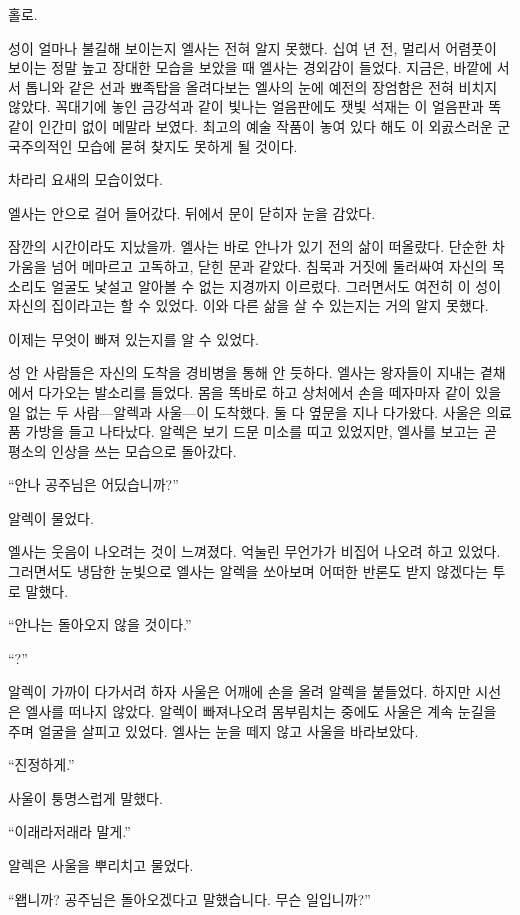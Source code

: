 홀로.

성이 얼마나 불길해 보이는지 엘사는 전혀 알지 못했다. 십여 년 전, 멀리서 어렴풋이 보이는 정말 높고 장대한 모습을 보았을 때 엘사는 경외감이 들었다. 지금은, 바깥에 서서 톱니와 같은 선과 뾰족탑을 올려다보는 엘사의 눈에 예전의 장엄함은 전혀 비치지 않았다. 꼭대기에 놓인 금강석과 같이 빛나는 얼음판에도 잿빛 석재는 이 얼음판과 똑같이 인간미 없이 메말라 보였다. 최고의 예술 작품이 놓여 있다 해도 이 외곬스러운 군국주의적인 모습에 묻혀 찾지도 못하게 될 것이다.

차라리 요새의 모습이었다.

엘사는 안으로 걸어 들어갔다. 뒤에서 문이 닫히자 눈을 감았다.

잠깐의 시간이라도 지났을까. 엘사는 바로 안나가 있기 전의 삶이 떠올랐다. 단순한 차가움을 넘어 메마르고 고독하고, 닫힌 문과 같았다. 침묵과 거짓에 둘러싸여 자신의 목소리도 얼굴도 낯설고 알아볼 수 없는 지경까지 이르렀다. 그러면서도 여전히 이 성이 자신의 집이라고는 할 수 있었다. 이와 다른 삶을 살 수 있는지는 거의 알지 못했다.

이제는 무엇이 빠져 있는지를 알 수 있었다.

성 안 사람들은 자신의 도착을 경비병을 통해 안 듯하다. 엘사는 왕자들이 지내는 곁채에서 다가오는 발소리를 들었다. 몸을 똑바로 하고 상처에서 손을 떼자마자 같이 있을 일 없는 두 사람—알렉과 사울—이 도착했다. 둘 다 옆문을 지나 다가왔다. 사울은 의료품 가방을 들고 나타났다. 알렉은 보기 드문 미소를 띠고 있었지만, 엘사를 보고는 곧 평소의 인상을 쓰는 모습으로 돌아갔다.

``안나 공주님은 어딨습니까?''

알렉이 물었다.

엘사는 웃음이 나오려는 것이 느껴졌다. 억눌린 무언가가 비집어 나오려 하고 있었다. 그러면서도 냉담한 눈빛으로 엘사는 알렉을 쏘아보며 어떠한 반론도 받지 않겠다는 투로 말했다.

``안나는 돌아오지 않을 것이다.''

``?''

알렉이 가까이 다가서려 하자 사울은 어깨에 손을 올려 알렉을 붙들었다. 하지만 시선은 엘사를 떠나지 않았다. 알렉이 빠져나오려 몸부림치는 중에도 사울은 계속 눈길을 주며 얼굴을 살피고 있었다. 엘사는 눈을 떼지 않고 사울을 바라보았다.

``진정하게.''

사울이 퉁명스럽게 말했다.

``이래라저래라 말게.''

알렉은 사울을 뿌리치고 물었다.

``왭니까? 공주님은 돌아오겠다고 말했습니다. 무슨 일입니까?''

